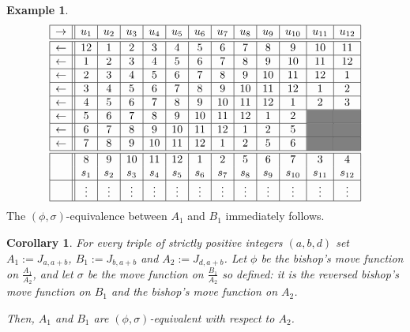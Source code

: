 \documentclass{amsart}
\newtheorem{cor}[prop]{Corollary}
\theoremstyle{definition}
\newtheorem{ex}[prop]{Example}
\numberwithin{equation}{section}
\begin{document}
\begin{ex}
\[
\begin{array}{|c||c|c|c|c|c|c|c|c|c|c|c|c|}\hline
\rightarrow&u_1&u_2&u_3&u_4&u_5&u_6&u_7&u_8&u_9&u_{10}&u_{11}&u_{12} \\ \hline \hline
\leftarrow&12&1&2&3&4&5&6&7&8&9&10&11 \\ \hline 
\leftarrow&1&2&3&4&5&6&7&8&9&10&11&12 \\ \hline 
\leftarrow&2&3&4&5&6&7&8&9&10&11&12&1 \\ \hline 
\leftarrow&3&4&5&6&7&8&9&10&11&12&1&2 \\ \hline 
\leftarrow&4&5&6&7&8&9&10&11&12&1&2&3 \\ \hline 
\leftarrow&5&6&7&8&9&10&11&12&1&2&\cellcolor{gray}&\cellcolor{gray} \\ \hline 
\leftarrow&6&7&8&9&10&11&12&1&2&5&\cellcolor{gray}&\cellcolor{gray} \\ \hline
\leftarrow&7&8&9&10&11&12&1&2&5&6&\cellcolor{gray}&\cellcolor{gray} \\ \hline\hline
&8&9&10&11&12&1&2&5&6&7&3&4 \\ 
&s_1&s_2&s_3&s_4&s_5&s_6&s_7&s_8&s_9&s_{10}&s_{11}&s_{12} \\ \hline  
 & \vdots & \vdots & \vdots & \vdots & \vdots & \vdots & \vdots & \vdots & \vdots & \vdots & \vdots & \vdots   \\ \hline
\end{array}
\]
The $(\phi,\sigma)$-equivalence between $A_1$ and $B_1$ immediately follows.
\end{ex}

\begin{cor}\label{cor:equiv_compl_filled}
For every triple of strictly positive integers $(a,b,d)$ set  $A_1:= J_{a,a+b}$,  $B_1:=J_{b,a+b}$ and $A_2:= J_{d,a+b}$. Let $\phi$ be the bishop's move function on 
$\frac{A_1}{A_2}$, and let $\sigma$ be the move function on $\frac{B_1}{A_2}$ so defined: it is the reversed bishop's move function on $B_1$ and
the bishop's move function on $A_2$.

Then, $A_1$ and $B_1$ are $(\phi,\sigma)$-equivalent with respect to $A_2$.  
\end{cor}
\end{document}

